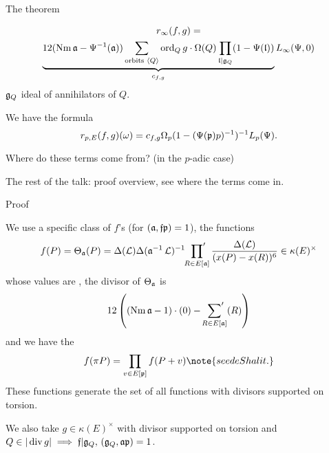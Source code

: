 \begin{frame}{The theorem}

\begin{theorem}
\begin{multline*}
r_\infty ( f,g) = \\
\underbrace{12 ( \operatorname{Nm} \mathfrak{a} - \Psi^{-1} (\mathfrak{a})) \sum_{\text{orbits } \langle Q \rangle} \operatorname{ord}_Q g \cdot \Omega(Q) \prod_{\mathfrak{l} | \mathfrak{g}_Q} (1- \Psi (\mathfrak{l}))}_{c_{f,g}} L_\infty (\Psi,0)
\end{multline*}
\(\mathfrak{g}_Q\) ideal of annihilators of \(Q\).%
\end{theorem}
\pause
\begin{theorem}
We have the formula%
\begin{equation*}
r_{p,E}(f,g)(\omega) = c_{f,g} \Omega_p (1 - (\Psi(\mathfrak{p}) p)^{-1})^{-1} L_p(\Psi)\text{.}
\end{equation*} \end{theorem} \pause
Where do these terms come from? (in the \(p\)-adic case)

The rest of the talk: proof overview, see where the terms come in.
\end{frame}

\begin{frame}{Proof}

    We use a specific class of \(f\)'s (for \((\mathfrak{a},\mathfrak{f} \mathfrak{p})=1\)), the functions%
\begin{equation*}
f( P ) = \Theta_{\mathfrak{a}}(P) = \Delta (\operatorname{\mathcal{L}}) \Delta (\mathfrak{a}^{-1} \operatorname{\mathcal{L}})^{-1} \sideset{}{'} \prod_{R\in E[\mathfrak{a}]} \frac{\Delta (\operatorname{\mathcal{L}})}{(x(P) - x(R))^6} \in \kappa (E)^\times
\end{equation*}
whose values are , the divisor of \(\Theta_{\mathfrak{a}}\) is%
\begin{equation*}
    12 \left( (\operatorname{Nm} \mathfrak{a} - 1) \cdot (0) - \sideset{}{'} \sum_{R\in E[\mathfrak{a} ]} (R) \right)
\end{equation*}
\pause
and we have the %
\begin{equation*}
f(\pi P )  =  \prod_{v \in E[\ideal p]} f(P + v) \note{see de Shalit.}
\end{equation*}
These functions generate the set of all functions with divisors supported on torsion.

We also take \(g\in \kappa (E)^\times\) with divisor supported on torsion and \( Q\in |\operatorname{div} g| \implies \mathfrak{f} | \mathfrak{g}_Q,\,(\mathfrak{g}_Q,\mathfrak{a} \mathfrak{p}) = 1\).
\end{frame}

